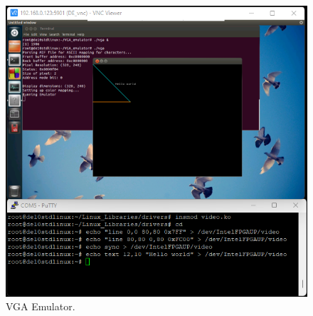 \documentclass[epsfig,10pt,fullpage]{article}
\newcommand{\CommonDocsPath}{../../common/docs}
\begin{document}
\begin{figure}[h]
   \begin{center}
       \includegraphics{figures/fig_emulator.png}
   \end{center}
   \caption{VGA Emulator.}
	\label{fig:emulator}
\end{figure}

\vskip 0.8in
\noindent
\newpage

\end{document}
